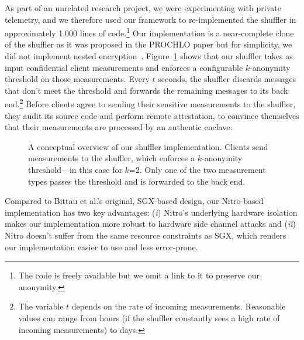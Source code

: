 As part of an unrelated research project, we were experimenting with private
telemetry, and we therefore used our framework to re-implemented the shuffler in
approximately 1,000 lines of code.\footnote{The code is freely available but we
omit a link to it to preserve our anonymity.}  Our implementation is a
near-complete clone of the shuffler as it was proposed in the PROCHLO paper but
for simplicity, we did not implement nested encryption~\cite[\S~3]{Bittau2017a}.
Figure~\ref{fig:shuffler} shows that our shuffler takes as input confidential
client measurements and enforces a configurable $k$-anonymity threshold on those
measurements.  Every $t$ seconds, the shuffler discards messages that don't meet
the threshold and forwards the remaining messages to its back end.\footnote{The
variable $t$ depends on the rate of incoming measurements.  Reasonable values
can range from hours (if the shuffler constantly sees a high rate of incoming
measurements) to days.} Before clients agree to sending their sensitive
measurements to the shuffler, they audit its source code and perform remote
attestation, to convince themselves that their measurements are processed by an
authentic enclave.

\begin{figure}[t]
\centering

\caption{A conceptual overview of our shuffler implementation.  Clients send
  measurements to the shuffler, which enforces a $k$-anonymity threshold---in
  this case for $k$=2. Only one of the two measurement types passes the
  threshold and is forwarded to the back end.}
\label{fig:shuffler}
\end{figure}

Compared to Bittau et al.'s original, SGX-based design, our Nitro-based
implementation has two key advantages: (\emph{i}) Nitro's underlying hardware
isolation makes our implementation more robust to hardware side channel attacks
and (\emph{ii}) Nitro doesn't suffer from the same resource constraints as SGX,
which renders our implementation easier to use and less error-prone.
